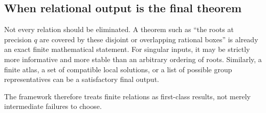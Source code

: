 \subsection{When relational output is the final theorem}

Not every relation should be eliminated.  A theorem such as ``the roots at precision \(q\) are covered by these disjoint or overlapping rational boxes'' is already an exact finite mathematical statement.  For singular inputs, it may be strictly more informative and more stable than an arbitrary ordering of roots.  Similarly, a finite atlas, a set of compatible local solutions, or a list of possible group representatives can be a satisfactory final output.

The framework therefore treats finite relations as first-class results, not merely intermediate failures to choose.
